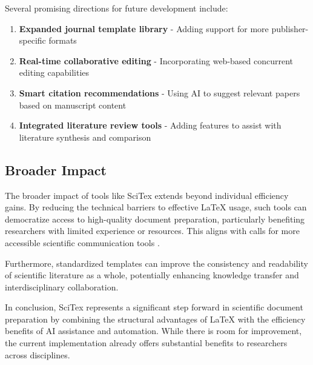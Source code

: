 \documentclass[preprint,review,12pt]{elsarticle}%
\providecommand{\DIFdelbegin}{} %
\providecommand{\DIFdelend}{} %
\newcommand{\DIFscaledelfig}{0.5}
\newlength{\DIFdelgraphicswidth} %
\newlength{\DIFdelgraphicsheight} %
\newcommand{\DIFdelincludegraphics}[2][]{%
\sbox{\DIFdelgraphicsbox}{\DIFOincludegraphics[#1]{#2}}%
\settoboxwidth{\DIFdelgraphicswidth}{\DIFdelgraphicsbox} %
\settoboxtotalheight{\DIFdelgraphicsheight}{\DIFdelgraphicsbox} %
\scalebox{\DIFscaledelfig}{%
\parbox[b]{\DIFdelgraphicswidth}{\usebox{\DIFdelgraphicsbox}\\[-\baselineskip] \rule{\DIFdelgraphicswidth}{0em}}\llap{\resizebox{\DIFdelgraphicswidth}{\DIFdelgraphicsheight}{%
\setlength{\unitlength}{\DIFdelgraphicswidth}%
\begin{picture}(1,1)%
\thicklines\linethickness{2pt} %
{\color[rgb]{1,0,0}\put(0,0){\framebox(1,1){}}}%
{\color[rgb]{1,0,0}\put(0,0){\line( 1,1){1}}}%
{\color[rgb]{1,0,0}\put(0,1){\line(1,-1){1}}}%
\end{picture}%
}\hspace*{3pt}}} %
} %
\DeclareRobustCommand{\DIFdelbegin}{\DIFOdelbegin \let\includegraphics\DIFdelincludegraphics} %
\DeclareRobustCommand{\DIFdelend}{\DIFOaddend \let\includegraphics\DIFOincludegraphics} %
\begin{document}
\begin{frontmatter}

Several promising directions for future development include:

\begin{enumerate}
    \item \textbf{Expanded journal template library} - Adding support for more publisher-specific formats
    \item \textbf{Real-time collaborative editing} - Incorporating web-based concurrent editing capabilities
    \item \textbf{Smart citation recommendations} - Using AI to suggest relevant papers based on manuscript content
    \item \textbf{Integrated literature review tools} - Adding features to assist with literature synthesis and comparison
\end{enumerate}

\subsection{Broader Impact}
\label{subsec:impact}

The broader impact of tools like SciTex extends beyond individual efficiency gains. By reducing the technical barriers to effective LaTeX usage, such tools can democratize access to high-quality document preparation, particularly benefiting researchers with limited experience or resources. This aligns with calls for more accessible scientific communication tools \cite{Patel2022}.

Furthermore, standardized templates can improve the consistency and readability of scientific literature as a whole, potentially enhancing knowledge transfer and interdisciplinary collaboration.

In conclusion, SciTex represents a significant step forward in scientific document preparation by combining the structural advantages of LaTeX with the efficiency benefits of AI assistance and automation. While there is room for improvement, the current implementation already offers substantial benefits to researchers across disciplines.

\DIFdelbegin %

\DIFdelend %


\end{frontmatter}
\end{document}
